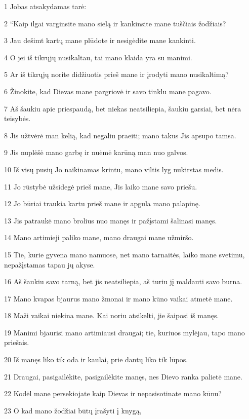\par 1 Jobas atsakydamas tarė: 
\par 2 “Kaip ilgai varginsite mano sielą ir kankinsite mane tuščiais žodžiais? 
\par 3 Jau dešimt kartų mane plūdote ir nesigėdite mane kankinti. 
\par 4 O jei iš tikrųjų nusikaltau, tai mano klaida yra su manimi. 
\par 5 Ar iš tikrųjų norite didžiuotis prieš mane ir įrodyti mano nusikaltimą? 
\par 6 Žinokite, kad Dievas mane pargriovė ir savo tinklu mane pagavo. 
\par 7 Aš šaukiu apie priespaudą, bet niekas neatsiliepia, šaukiu garsiai, bet nėra teisybės. 
\par 8 Jis užtvėrė man kelią, kad negaliu praeiti; mano takus Jis apsupo tamsa. 
\par 9 Jis nuplėšė mano garbę ir nuėmė karūną man nuo galvos. 
\par 10 Iš visų pusių Jo naikinamas krintu, mano viltis lyg nukirstas medis. 
\par 11 Jo rūstybė užsidegė prieš mane, Jis laiko mane savo priešu. 
\par 12 Jo būriai traukia kartu prieš mane ir apgula mano palapinę. 
\par 13 Jis patraukė mano brolius nuo manęs ir pažįstami šalinasi manęs. 
\par 14 Mano artimieji paliko mane, mano draugai mane užmiršo. 
\par 15 Tie, kurie gyvena mano namuose, net mano tarnaitės, laiko mane svetimu, nepažįstamas tapau jų akyse. 
\par 16 Aš šaukiu savo tarną, bet jis neatsiliepia, aš turiu jį maldauti savo burna. 
\par 17 Mano kvapas bjaurus mano žmonai ir mano kūno vaikai atmetė mane. 
\par 18 Maži vaikai niekina mane. Kai noriu atsikelti, jie šaiposi iš manęs. 
\par 19 Manimi bjaurisi mano artimiausi draugai; tie, kuriuos mylėjau, tapo mano priešais. 
\par 20 Iš manęs liko tik oda ir kaulai, prie dantų liko tik lūpos. 
\par 21 Draugai, pasigailėkite, pasigailėkite manęs, nes Dievo ranka palietė mane. 
\par 22 Kodėl mane persekiojate kaip Dievas ir nepasisotinate mano kūnu? 
\par 23 O kad mano žodžiai būtų įrašyti į knygą, 
